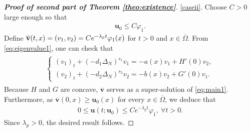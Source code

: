 \documentclass[a4paper,11pt]{amsart}
\theoremstyle{definition}
\def\O{\Omega}
\numberwithin{equation}{section}
\theoremstyle{definition}
\def\O{\Omega}
\begin{document}
\begin{proof}[\bf Proof of second part of Theorem \ref{theo:existence}]

\ref{caseii}. Choose $C>0$ large enough so that
\begin{align*}
\textbf{u}_0\leq C\varphi_1.
\end{align*}
Define $\overline{\bf v}(t,x)=(v_1,v_2)=C e^{-\lambda_p t}\varphi_1(x)$ for $t>0$ and $x\in \overline{\O}$. From \eqref{eq:eigenvalue1}, one can check that
\begin{align*}
\begin{split}
\left\{\begin{array}{lllll}
(v_1)_t+(-d_1\Delta_N)^{s_1}v_1=-a(x)v_1+H'(0)v_2, \\
(v_2)_t+(-d_2\Delta_N)^{s_2}v_2=-b(x)v_2+G'(0)v_1.
\end{array}\right.
\end{split}
\end{align*}
Because $H$ and $G$ are concave, $\overline{\mathbf{v}}$ serves as a super-solution of \eqref{eq:main1}. Furthermore, as $\overline{\mathbf{v}}(0,x) \geq \mathbf{u}_0(x)$ for every $x \in \overline{\Omega}$, we deduce that
\begin{align*}
0\leq \textbf{u}(t;\textbf{u}_0)\leq C e^{-\lambda_p t}\varphi_1,~\forall t>0.
\end{align*}
Since $\lambda_p > 0$, the desired result follows.

\end{proof}
\end{document}
